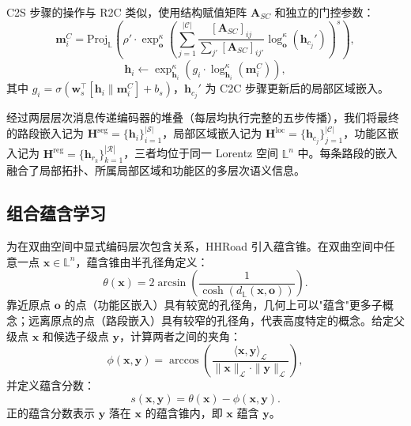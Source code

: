 C2S 步骤的操作与 R2C 类似，使用结构赋值矩阵 $\mathbf{A}_{SC}$ 和独立的门控参数：
\begin{equation}
    \mathbf{m}_{i}^{C} = \text{Proj}_{\mathbb{L}}\!\left(
      \rho' \cdot \exp_{\mathbf{o}}^\kappa\!\left(
        \sum_{j=1}^{|\mathcal{C}|} \frac{[\mathbf{A}_{SC}]_{ij}}{\sum_{j'} [\mathbf{A}_{SC}]_{ij'}}
        \log_{\mathbf{o}}^\kappa(\mathbf{h}_{c_j}')
      \right)^s
    \right),
    \label{eq:c2s_msg}
\end{equation}
\begin{equation}
    \mathbf{h}_{i} \leftarrow \exp_{\mathbf{h}_{i}}^\kappa\!\left(
      g_{i} \cdot \log_{\mathbf{h}_{i}}^\kappa(\mathbf{m}_{i}^{C})
    \right),
    \label{eq:gate_seg}
\end{equation}
其中 $g_{i} = \sigma\!\left(\mathbf{w}_s^\top [\mathbf{h}_{i} \| \mathbf{m}_{i}^{C}] + b_s\right)$，$\mathbf{h}_{c_j}'$ 为 C2C 步骤更新后的局部区域嵌入。

经过两层层次消息传递编码器的堆叠（每层均执行完整的五步传播），我们将最终的路段嵌入记为 $\mathbf{H}^{\text{seg}} = \{\mathbf{h}_i\}_{i=1}^{|\mathcal{S}|}$，局部区域嵌入记为 $\mathbf{H}^{\text{loc}} = \{\mathbf{h}_{c_j}\}_{j=1}^{|\mathcal{C}|}$，功能区嵌入记为 $\mathbf{H}^{\text{reg}} = \{\mathbf{h}_{r_k}\}_{k=1}^{|\mathcal{R}|}$，三者均位于同一 Lorentz 空间 $\mathbb{L}^n$ 中。每条路段的嵌入融合了局部拓扑、所属局部区域和功能区的多层次语义信息。

\subsection{组合蕴含学习}

为在双曲空间中显式编码层次包含关系，HHRoad 引入蕴含锥。在双曲空间中任意一点 $\mathbf{x} \in \mathbb{L}^n$，蕴含锥由半孔径角定义：
\begin{equation}
    \theta(\mathbf{x}) = 2\arcsin\!\left(\frac{1}{\cosh\!\left(d_{\mathbb{L}}(\mathbf{x}, \mathbf{o})\right)}\right).
    \label{eq:aperture}
\end{equation}
靠近原点 $\mathbf{o}$ 的点（功能区嵌入）具有较宽的孔径角，几何上可以"蕴含"更多子概念；远离原点的点（路段嵌入）具有较窄的孔径角，代表高度特定的概念。给定父级点 $\mathbf{x}$ 和候选子级点 $\mathbf{y}$，计算两者之间的夹角：
\begin{equation}
    \phi(\mathbf{x}, \mathbf{y}) = \arccos\!\left(
      \frac{\langle \mathbf{x}, \mathbf{y} \rangle_{\mathcal{L}}}
           {\|\mathbf{x}\|_{\mathcal{L}} \cdot \|\mathbf{y}\|_{\mathcal{L}}}
    \right),
    \label{eq:angle}
\end{equation}
并定义蕴含分数：
\begin{equation}
    s(\mathbf{x}, \mathbf{y}) = \theta(\mathbf{x}) - \phi(\mathbf{x}, \mathbf{y}).
    \label{eq:entail_score}
\end{equation}
正的蕴含分数表示 $\mathbf{y}$ 落在 $\mathbf{x}$ 的蕴含锥内，即 $\mathbf{x}$ 蕴含 $\mathbf{y}$。

